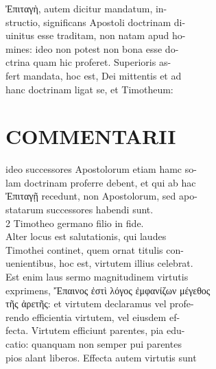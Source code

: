 \documentclass{article}
\begin{document}
\begin{pages}
Ἐπιταγὴ, autem dicitur mandatum, in- \\
                structio, significans Apostoli doctrinam di- \\
                uinitus esse traditam, non natam apud ho- \\
                mines: ideo non potest non bona esse do- \\
                ctrina quam hic proferet. Superioris as- \\
                fert mandata, hoc est, Dei mittentis et ad \\
                hanc doctrinam ligat se, et Timotheum: \\
                
\section*{COMMENTARII \\
                }
ideo successores Apostolorum etiam hamc so- \\
                lam doctrinam proferre debent, et qui ab hac \\
                Ἐπιταγῇ  recedunt, non Apostolorum, sed apo- \\
                statarum successores habendi sunt. \\
                2 Timotheo germano filio in fide. \\
                Alter locus est salutationis, qui laudes \\
                Timothei continet, quem ornat titulis con- \\
                uenientibus, hoc est, virtutem illius celebrat. \\
                Est enim laus sermo magnitudinem virtutis \\
                exprimens, Ἔπαινος ἐστὶ λόγος ἐμφανίζων μέγεθος \\
                τῆς ἀρετῆς: et virtutem declaramus vel profe- \\
                rendo efficientia virtutem, vel eiusdem ef- \\
                fecta. Virtutem efficiunt parentes, pia edu- \\
                catio: quanquam non semper pui parentes \\
                pios alant liberos. Effecta autem virtutis sunt \\

\end{pages}
\end{document}
